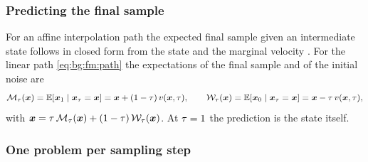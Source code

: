 \subsubsection*{Predicting the final sample}

For an affine interpolation path the expected final sample given an intermediate state follows in
closed form from the state and the marginal velocity \parencite[Lemma~1]{li2025hardflow}. For the linear
path \eqref{eq:bg:fm:path} the expectations of the final sample and of the initial noise are
\begin{equation}\label{eq:method:hf:post}
  \mathcal{M}_{\tau}(\boldsymbol{x}) = \mathbb{E}\!\left[\boldsymbol{x}_{1}\mid\boldsymbol{x}_{\tau}=\boldsymbol{x}\right]
    = \boldsymbol{x} + (1-\tau)\,v(\boldsymbol{x},\tau),
  \qquad
  \mathcal{W}_{\tau}(\boldsymbol{x}) = \mathbb{E}\!\left[\boldsymbol{x}_{0}\mid\boldsymbol{x}_{\tau}=\boldsymbol{x}\right]
    = \boldsymbol{x} - \tau\,v(\boldsymbol{x},\tau),
\end{equation}
with $\boldsymbol{x} = \tau\,\mathcal{M}_{\tau}(\boldsymbol{x}) + (1-\tau)\,\mathcal{W}_{\tau}(\boldsymbol{x})$.
At $\tau=1$ the prediction is the state itself.

\subsubsection*{One problem per sampling step}

